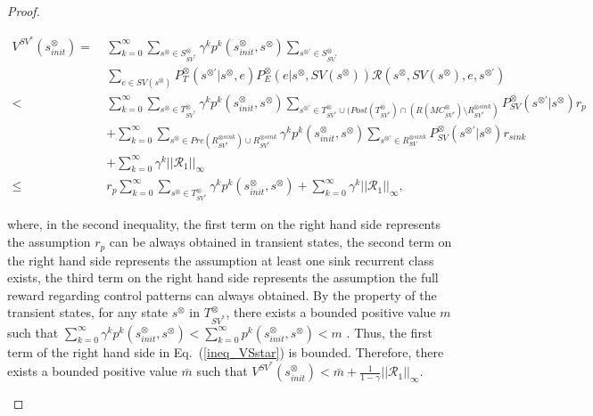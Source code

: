 \documentclass[10pt]{article}
\theoremstyle{definition}
\begin{document}
\begin{proof}
\begin{enumerate}
  \begin{align}
    V^{SV^{\ast}}\!(s^{\otimes}_{init})
    =\ & \sum_{k=0}^{\infty} \sum_{s^{\otimes} \in S^{\otimes}_{SV^{\ast}}} \gamma^k p^k(s^{\otimes}_{init}, s^{\otimes}) \sum_{s^{\otimes \prime} \in S^{\otimes}_{SV^{\ast}}} \nonumber \\
     & \sum_{e \in SV(s^{\otimes})} P^{\otimes}_T (s^{\otimes \prime} | s^{\otimes}, e) P^{\otimes}_E (e | s^{\otimes}, SV(s^{\otimes})) \mathcal{R}(s^{\otimes}, SV(s^{\otimes}), e, s^{\otimes \prime})  \nonumber \\
     <\ & \sum_{k=0}^{\infty} \sum_{s^{\otimes} \in T^{\otimes}_{SV^{\ast}}} \gamma^k p^k(s^{\otimes}_{init}, s^{\otimes}) \sum_{s^{\otimes \prime} \in T^{\otimes}_{SV^{\ast}} \cup ( Post(T^{\otimes}_{SV^{\ast}}) \cap (R(MC^{\otimes}_{SV^{\ast}}) \setminus R^{\otimes sink}_{SV^{\ast}})} P^{\otimes}_{SV} (s^{\otimes \prime} | s^{\otimes}) r_p \nonumber \\
     & + \sum_{k=0}^{\infty} \sum_{s^{\otimes} \in Pre(R^{\otimes sink}_{SV^{\ast}}) \cup R^{\otimes sink}_{SV^{\ast}}} \gamma^k p^k(s^{\otimes}_{init}, s^{\otimes}) \sum_{s^{\otimes \prime} \in R^{\otimes sink}_{SV}} P^{\otimes}_{SV}(s^{\otimes \prime}|s^{\otimes}) r_{sink}  \nonumber \\
     & + \sum_{k=0}^{\infty} \gamma^k ||\mathcal{R}_1||_{\infty} \nonumber \\
     \leq\ & r_p \sum_{k=0}^{\infty} \sum_{s^{\otimes} \in T^{\otimes}_{SV^{\ast}}} \gamma^k p^k(s^{\otimes}_{init}, s^{\otimes}) + \sum_{k=0}^{\infty} \gamma^k ||\mathcal{R}_1||_{\infty},
  \label{ineq_VSstar}
  \end{align}

  where, in the second inequality, the first term on the right hand side represents the assumption $r_p$ can be always obtained in transient states, the second term on the right hand side represents the assumption at least one sink recurrent class exists, the third term on the right hand side represents the assumption the full reward regarding control patterns can always obtained.
  By the property of the transient states, for any state $s^{\otimes}$ in $T^{\otimes}_{SV^{\ast}}$, there exists a bounded positive value $m$ such that $ \sum_{k=0}^{\infty} \gamma^k p^k(s^{\otimes}_{init}, s^{\otimes}) < \sum_{k=0}^{\infty} p^k(s^{\otimes}_{init}, s^{\otimes}) < m$ \cite{ESS}. Thus, the first term of the right hand side in Eq.\ (\ref{ineq_VSstar}) is bounded. Therefore, there exists a bounded positive value $\bar{m}$ such that $V^{SV^{\ast}}(s^{\otimes}_{init}) < \bar{m} + \frac{1}{1-\gamma} ||\mathcal{R}_1||_{\infty}$.


\end{enumerate}
\end{proof}
\end{document}

